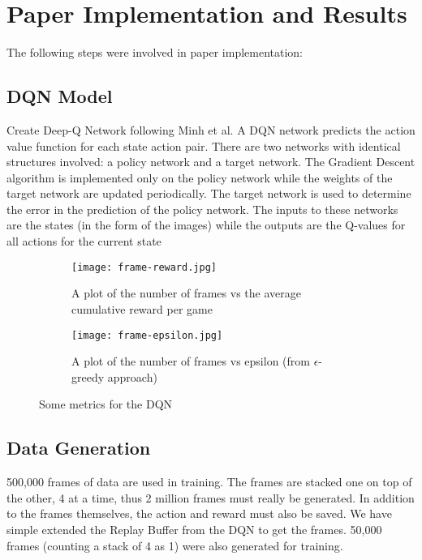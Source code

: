 \documentclass[12pt, a4paper, oneside]{report}
\begin{document}
    \chapter{Paper Implementation and Results}
    \par The following steps were involved in paper implementation:
        \section{DQN Model}
            \par Create Deep-Q Network following Minh et al. A DQN network predicts the action value function for each state action pair. There are two networks with identical structures involved: a policy network and a target network. The Gradient Descent algorithm is implemented only on the policy network while the weights of the target network are updated periodically. The target network is used to determine the error in the prediction of the policy network. The inputs to these networks are the states (in the form of the images) while the outputs are the Q-values for all actions for the current state
            \begin{figure}[h!]
                \centering
                \begin{subfigure}[b]{0.4\textwidth}
                    \centering
                    \texttt{[image: frame-reward.jpg]}
                    \caption{A plot of the number of frames vs the average cumulative reward per game}
                \end{subfigure}
                \hfill
                \begin{subfigure}[b]{0.4\textwidth}
                    \centering
                    \texttt{[image: frame-epsilon.jpg]}
                    \caption{A plot of the number of frames vs epsilon (from $\epsilon$-greedy approach)}
                \end{subfigure}
                \caption{Some metrics for the DQN}
            \end{figure}

        \section{Data Generation} 
            \par 500,000 frames of data are used in training. The frames are stacked one on top of the other, 4 at a time, thus 2 million frames must really be generated. In addition to the frames themselves, the action and reward must also be saved. We have simple extended the Replay Buffer from the DQN to get the frames. 50,000 frames (counting a stack of 4 as 1) were also generated for training.
        
\end{document}
